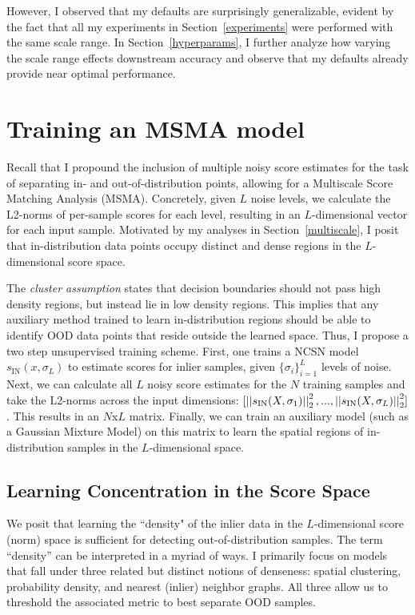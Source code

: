 However, I observed that my defaults are surprisingly generalizable, evident by the fact that all my experiments in Section~\ref{experiments} were performed with the same scale range. In Section~\ref{hyperparams}, I further analyze how varying the scale range effects downstream accuracy and observe that my defaults already provide near optimal performance.


\section{Training an MSMA model}

Recall that I propound the inclusion of multiple noisy score estimates for the task of separating in- and out-of-distribution points, allowing for a Multiscale Score Matching Analysis (MSMA). Concretely, given $L$ noise levels, we calculate the L2-norms of per-sample scores for each level, resulting in an $L$-dimensional vector for each input sample. Motivated by my analyses in Section~\ref{multiscale}, I posit that in-distribution data points occupy distinct and dense regions in the $L$-dimensional score space.

The \textit{cluster assumption} states that decision boundaries should not pass high density regions, but instead lie in low density regions. This implies that any auxiliary method trained to learn in-distribution regions should be able to identify OOD data points that reside outside the learned space. Thus, I propose a two step unsupervised training scheme. First, one trains a NCSN model $s_{\text{IN}}(x, \sigma_L)$ to estimate scores for inlier samples, given $\{\sigma_i\}_{i=1}^L$ levels of noise. Next, we can calculate all $L$ noisy score estimates for the $N$ training samples and take the L2-norms across the input dimensions: $[\left|\left| {  s_{\text{IN}} (X, \sigma_1) } \right|\right|_2^2, ... , \left|\left| {  s_{\text{IN}} (X, \sigma_L) } \right|\right|_2^2 ]$. This results in an $N$x$L$ matrix. Finally, we can train an auxiliary model (such as a Gaussian Mixture Model) on this matrix to learn the spatial regions of in-distribution samples in the $L$-dimensional space.

\subsection*{Learning Concentration in the Score Space}

We posit that learning the ``density" of the inlier data in the $L$-dimensional score (norm) space is sufficient for detecting out-of-distribution samples. The term “density” can be interpreted in a myriad of ways. I primarily focus on models that fall under three related but distinct notions of denseness: spatial clustering, probability density, and nearest (inlier) neighbor graphs. All three allow us to threshold the associated metric to best separate OOD samples.


